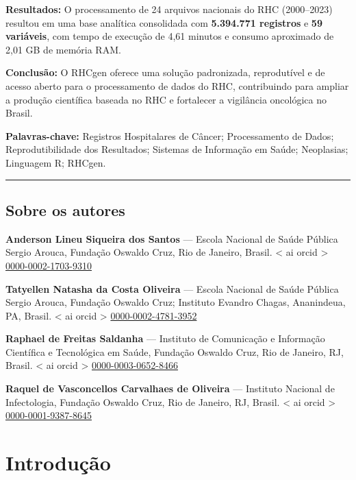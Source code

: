 \documentclass[
  brazilian,
  a4paper,
  oneside]{scrbook}
\begin{document}
\textbf{Resultados:} O processamento de 24 arquivos nacionais do RHC
(2000--2023) resultou em uma base analítica consolidada com
\textbf{5.394.771 registros} e \textbf{59 variáveis}, com tempo de
execução de 4,61 minutos e consumo aproximado de 2,01 GB de memória RAM.

\textbf{Conclusão:} O RHCgen oferece uma solução padronizada,
reprodutível e de acesso aberto para o processamento de dados do RHC,
contribuindo para ampliar a produção científica baseada no RHC e
fortalecer a vigilância oncológica no Brasil.

\textbf{Palavras-chave:} Registros Hospitalares de Câncer; Processamento
de Dados; Reprodutibilidade dos Resultados; Sistemas de Informação em
Saúde; Neoplasias; Linguagem R; RHCgen.

\begin{center}\rule{0.5\linewidth}{0.5pt}\end{center}

\section*{Sobre os autores}\label{sobre-os-autores}


\textbf{Anderson Lineu Siqueira dos Santos} --- Escola Nacional de Saúde
Pública Sergio Arouca, Fundação Oswaldo Cruz, Rio de Janeiro, Brasil.
{{< ai orcid >}}
\href{https://orcid.org/0000-0002-1703-9310}{0000-0002-1703-9310}

\textbf{Tatyellen Natasha da Costa Oliveira} --- Escola Nacional de
Saúde Pública Sergio Arouca, Fundação Oswaldo Cruz; Instituto Evandro
Chagas, Ananindeua, PA, Brasil. {{< ai orcid >}}
\href{https://orcid.org/0000-0002-4781-3952}{0000-0002-4781-3952}

\textbf{Raphael de Freitas Saldanha} --- Instituto de Comunicação e
Informação Científica e Tecnológica em Saúde, Fundação Oswaldo Cruz, Rio
de Janeiro, RJ, Brasil. {{< ai orcid >}}
\href{https://orcid.org/0000-0003-0652-8466}{0000-0003-0652-8466}

\textbf{Raquel de Vasconcellos Carvalhaes de Oliveira} --- Instituto
Nacional de Infectologia, Fundação Oswaldo Cruz, Rio de Janeiro, RJ,
Brasil. {{< ai orcid >}}
\href{https://orcid.org/0000-0001-9387-8645}{0000-0001-9387-8645}


\chapter{Introdução}\label{introduuxe7uxe3o}
\end{document}
